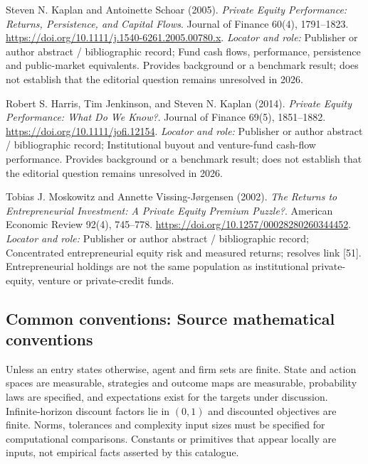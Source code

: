\documentclass[11pt,a4paper]{article}
\begin{document}
\begin{enumerate}[label={[S\arabic*]},leftmargin=*]

\item Steven N. Kaplan and Antoinette Schoar (2005). \emph{Private Equity Performance: Returns, Persistence, and Capital Flows}. Journal of Finance 60(4), 1791–1823. \url{https://doi.org/10.1111/j.1540-6261.2005.00780.x}.
\textit{Locator and role:} Publisher or author abstract / bibliographic record; Fund cash flows, performance, persistence and public-market equivalents. Provides background or a benchmark result; does not establish that the editorial question remains unresolved in 2026.

\item Robert S. Harris, Tim Jenkinson, and Steven N. Kaplan (2014). \emph{Private Equity Performance: What Do We Know?}. Journal of Finance 69(5), 1851–1882. \url{https://doi.org/10.1111/jofi.12154}.
\textit{Locator and role:} Publisher or author abstract / bibliographic record; Institutional buyout and venture-fund cash-flow performance. Provides background or a benchmark result; does not establish that the editorial question remains unresolved in 2026.

\item Tobias J. Moskowitz and Annette Vissing-Jørgensen (2002). \emph{The Returns to Entrepreneurial Investment: A Private Equity Premium Puzzle?}. American Economic Review 92(4), 745–778. \url{https://doi.org/10.1257/00028280260344452}.
\textit{Locator and role:} Publisher or author abstract / bibliographic record; Concentrated entrepreneurial equity risk and measured returns; resolves link [51]. Entrepreneurial holdings are not the same population as institutional private-equity, venture or private-credit funds.

\end{enumerate}

\subsection*{Common conventions: Source mathematical conventions}

Unless an entry states otherwise, agent and firm sets are finite. State and action spaces are measurable, strategies and outcome maps are measurable, probability laws are specified, and expectations exist for the targets under discussion. Infinite-horizon discount factors lie in $(0,1)$ and discounted objectives are finite. Norms, tolerances and complexity input sizes must be specified for computational comparisons. Constants or primitives that appear locally are inputs, not empirical facts asserted by this catalogue.
\end{document}

